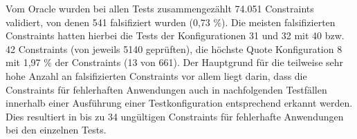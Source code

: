 Vom Oracle wurden bei allen Tests zusammengezählt 74.051 Constraints validiert, von denen 541 falsifiziert wurden (0,73 \%).
Die meisten falsifizierten Constraints hatten hierbei die Tests der Konfigurationen 31 und 32 mit 40 bzw. 42 Constraints (von jeweils 5140 geprüften), die höchste Quote Konfiguration 8 mit 1,97 \% der Constraints (13 von 661).
Der Hauptgrund für die teilweise sehr hohe Anzahl an falsifizierten Constraints vor allem liegt darin, dass die Constraints für fehlerhaften Anwendungen auch in nachfolgenden Testfällen innerhalb einer Ausführung einer Testkonfiguration entsprechend erkannt werden.
Dies resultiert in bis zu 34 ungültigen Constraints für fehlerhafte Anwendungen bei den einzelnen Tests.
